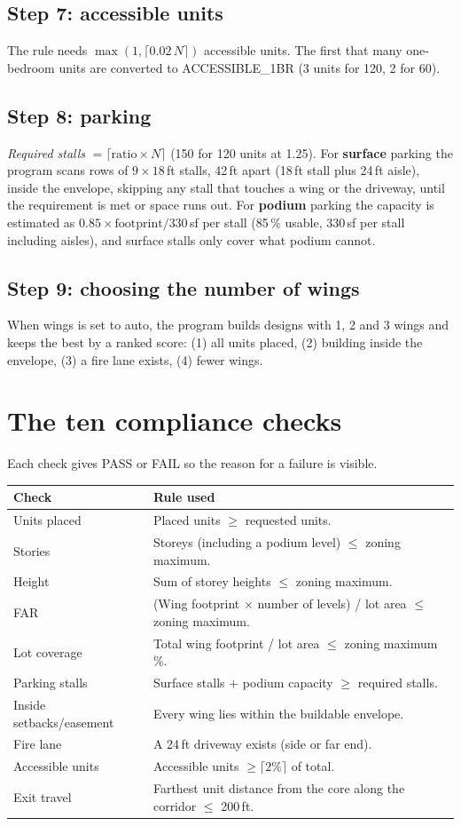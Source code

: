 \documentclass[11pt]{article}
\begin{document}
\subsection{Step 7: accessible units}
The rule needs $\max(1,\lceil 0.02\,N\rceil)$ accessible units. The first that many one-bedroom units are converted to ACCESSIBLE\_1BR (3 units for 120, 2 for 60).

\subsection{Step 8: parking}
\emph{Required stalls} $=\lceil \text{ratio}\times N\rceil$ (150 for 120 units at 1.25). For \textbf{surface} parking the program scans rows of $9\times18$\,ft stalls, 42\,ft apart (18\,ft stall
plus 24\,ft aisle), inside the envelope, skipping any stall that touches a wing or the driveway, until the requirement is met or space runs out. For \textbf{podium} parking the capacity is estimated as
$0.85\times\text{footprint}/330$\,sf per stall (85\,\% usable, 330\,sf per stall including aisles), and surface stalls only cover what podium cannot.

\subsection{Step 9: choosing the number of wings}
When wings is set to auto, the program builds designs with 1, 2 and 3 wings and keeps the best by a ranked score: (1) all units placed, (2) building inside the envelope, (3) a fire lane exists, (4) fewer wings.

\section{The ten compliance checks}
Each check gives PASS or FAIL so the reason for a failure is visible.
\begin{table}[H]\centering\small
\begin{tabular}{@{}lp{9cm}@{}}\toprule
Check & Rule used \\ \midrule
Units placed & Placed units $\ge$ requested units. \\
Stories & Storeys (including a podium level) $\le$ zoning maximum. \\
Height & Sum of storey heights $\le$ zoning maximum. \\
FAR & (Wing footprint $\times$ number of levels) / lot area $\le$ zoning maximum. \\
Lot coverage & Total wing footprint / lot area $\le$ zoning maximum \%. \\
Parking stalls & Surface stalls + podium capacity $\ge$ required stalls. \\
Inside setbacks/easement & Every wing lies within the buildable envelope. \\
Fire lane & A 24\,ft driveway exists (side or far end). \\
Accessible units & Accessible units $\ge \lceil 2\%\rceil$ of total. \\
Exit travel & Farthest unit distance from the core along the corridor $\le$ 200\,ft. \\ \bottomrule
\end{tabular}\end{table}
\end{document}

